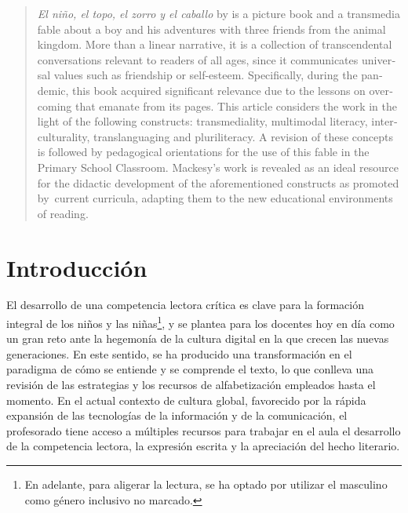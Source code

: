 \documentclass[spanish]{textolivre}
\begin{document}
\begin{polyabstract}
\begin{portuguese}
\begin{abstract}
\end{abstract}
\end{portuguese}

\begin{english}
\begin{abstract}
\textit{El niño, el topo, el zorro y el caballo} by \textcite{mackesy_nino_2020} is a picture book and a transmedia fable about a boy and his adventures with three friends from the animal kingdom. More than a linear narrative, it is a collection of transcendental conversations relevant to readers of all ages, since it communicates universal values such as friendship or self-esteem. Specifically, during the pandemic, this book acquired significant relevance due to the lessons on overcoming that emanate from its pages. This article considers the work in the light of the following constructs: transmediality, multimodal literacy, interculturality, translanguaging and pluriliteracy. A revision of these concepts is followed by pedagogical orientations for the use of this fable in the Primary School Classroom. Mackesy's work is revealed as an ideal resource for the didactic development of the aforementioned constructs as promoted by current curricula, adapting them to the new educational environments of reading. 

\end{abstract}
\end{english}
\end{polyabstract}

\section{Introducción}\label{sec-intro}
El desarrollo de una competencia lectora crítica es clave para la formación integral de los niños y las niñas\footnote{En adelante, para aligerar la lectura, se ha optado por utilizar el masculino como género inclusivo no marcado.}, y se plantea para los docentes hoy en día como un gran reto ante la hegemonía de la cultura digital en la que crecen las nuevas generaciones. En este sentido, se ha producido una transformación en el paradigma de cómo se entiende y se comprende el texto, lo que conlleva una revisión de las estrategias y los recursos de alfabetización empleados hasta el momento. En el actual contexto de cultura global, favorecido por la rápida expansión de las tecnologías de la información y de la comunicación, el profesorado tiene acceso a múltiples recursos para trabajar en el aula el desarrollo de la competencia lectora, la expresión escrita y la apreciación del hecho literario.
\end{document}

